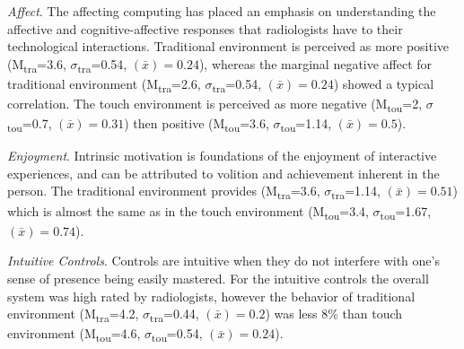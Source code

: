 \documentclass{chi-ext}
\begin{document}
\textit{Affect}. The affecting computing has placed an emphasis on understanding the affective and cognitive-affective responses that radiologists have to their technological interactions. Traditional environment is perceived as more positive (M\textsubscript{tra}=3.6, $\sigma$\textsubscript{tra}=0.54, {}$\left({\bar x}\right)=0.24$), whereas the marginal negative affect for traditional environment (M\textsubscript{tra}=2.6, $\sigma$\textsubscript{tra}=0.54, {}$\left({\bar x}\right)=0.24$) showed a typical correlation. The touch environment is perceived as more negative (M\textsubscript{tou}=2, $\sigma$\textsubscript{tou}=0.7, {}$\left({\bar x}\right)=0.31$) then positive (M\textsubscript{tou}=3.6, $\sigma$\textsubscript{tou}=1.14, {}$\left({\bar x}\right)=0.5$).

\textit{Enjoyment}. Intrinsic motivation is foundations of the enjoyment of interactive experiences, and can be attributed to volition and achievement inherent in the person. The traditional environment provides (M\textsubscript{tra}=3.6, $\sigma$\textsubscript{tra}=1.14, {}$\left({\bar x}\right)=0.51$) which is almost the same as in the touch environment (M\textsubscript{tou}=3.4, $\sigma$\textsubscript{tou}=1.67, {}$\left({\bar x}\right)=0.74$).

\clearpage
 
\textit{Intuitive Controls}. Controls are intuitive when they do not interfere with one's sense of presence being easily mastered. For the intuitive controls the overall system was high rated by radiologists, however the behavior of traditional environment (M\textsubscript{tra}=4.2, $\sigma$\textsubscript{tra}=0.44, {}$\left({\bar x}\right)=0.2$) was less 8\% than touch environment (M\textsubscript{tou}=4.6, $\sigma$\textsubscript{tou}=0.54, {}$\left({\bar x}\right)=0.24$).
\end{document}
